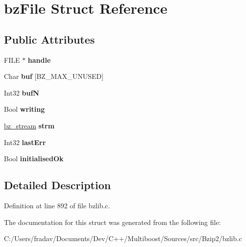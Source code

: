 \hypertarget{structbzFile}{\section{bz\-File Struct Reference}
\label{structbzFile}
}
\subsection*{Public Attributes}
\begin{DoxyCompactItemize}
\item 
\hypertarget{structbzFile_a3d38c435d545b14eaa38db1d569d64b5}{F\-I\-L\-E $\ast$ {\bfseries handle}}\label{structbzFile_a3d38c435d545b14eaa38db1d569d64b5}

\item 
\hypertarget{structbzFile_a5899bab16e8dc86cdcb9dba1eee3a27d}{Char {\bfseries buf} \mbox{[}B\-Z\-\_\-\-M\-A\-X\-\_\-\-U\-N\-U\-S\-E\-D\mbox{]}}\label{structbzFile_a5899bab16e8dc86cdcb9dba1eee3a27d}

\item 
\hypertarget{structbzFile_a4a19af6faa294019774c79d3d556b4c5}{Int32 {\bfseries buf\-N}}\label{structbzFile_a4a19af6faa294019774c79d3d556b4c5}

\item 
\hypertarget{structbzFile_add23e1bf4a70d3b47e53738ea6ea779c}{Bool {\bfseries writing}}\label{structbzFile_add23e1bf4a70d3b47e53738ea6ea779c}

\item 
\hypertarget{structbzFile_a80361d5f89e6b81e3054a7f66251755b}{\hyperlink{structbz__stream}{bz\-\_\-stream} {\bfseries strm}}\label{structbzFile_a80361d5f89e6b81e3054a7f66251755b}

\item 
\hypertarget{structbzFile_ac74fd63e8d38ce89a165de8aa70cfab1}{Int32 {\bfseries last\-Err}}\label{structbzFile_ac74fd63e8d38ce89a165de8aa70cfab1}

\item 
\hypertarget{structbzFile_a9786a78aa951d4ec101350dbaf6328d1}{Bool {\bfseries initialised\-Ok}}\label{structbzFile_a9786a78aa951d4ec101350dbaf6328d1}

\end{DoxyCompactItemize}


\subsection{Detailed Description}


Definition at line 892 of file bzlib.\-c.



The documentation for this struct was generated from the following file\-:\begin{DoxyCompactItemize}
\item 
C\-:/\-Users/fradav/\-Documents/\-Dev/\-C++/\-Multiboost/\-Sources/src/\-Bzip2/bzlib.\-c\end{DoxyCompactItemize}
